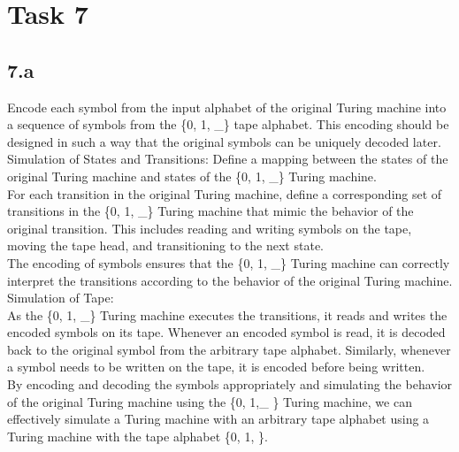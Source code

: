 \chapter{Task 7}
\section{7.a}
    Encode each symbol from the input alphabet of the original Turing machine into a sequence of symbols from the \{0, 1, \_\} tape alphabet. This encoding should be designed in such a way that the original symbols can be uniquely decoded later.\\

    Simulation of States and Transitions:
        Define a mapping between the states of the original Turing machine and states of the \{0, 1, \_\} Turing machine.\\
        For each transition in the original Turing machine, define a corresponding set of transitions in the \{0, 1, \_\} Turing machine that mimic the behavior of the original transition. This includes reading and writing symbols on the tape, moving the tape head, and transitioning to the next state.\\
        The encoding of symbols ensures that the \{0, 1, \_\} Turing machine can correctly interpret the transitions according to the behavior of the original Turing machine.\\

    Simulation of Tape:\\
        As the \{0, 1, \_\} Turing machine executes the transitions, it reads and writes the encoded symbols on its tape.
        Whenever an encoded symbol is read, it is decoded back to the original symbol from the arbitrary tape alphabet.
        Similarly, whenever a symbol needs to be written on the tape, it is encoded before being written.\\

By encoding and decoding the symbols appropriately and simulating the behavior of the original Turing machine using the \{0, 1,\_ \} Turing machine, we can effectively simulate a Turing machine with an arbitrary tape alphabet using a Turing machine with the tape alphabet \{0, 1, \}.
